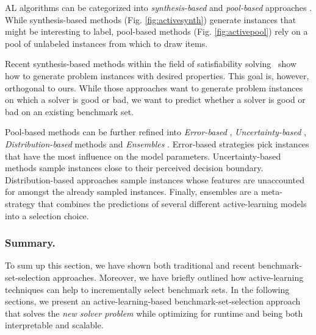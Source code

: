 \documentclass[runningheads]{llncs}
\begin{document}

AL algorithms can be categorized into \textit{synthesis-bas\-ed} \cite{0001AEMN22,GarzonMG22,2019gaal} and \textit{pool-bas\-ed} approaches \cite{GolbandiKL11,distribAL,HarpaleY08,KapoorGUD07,KorenBV09,KornerW06,MelvilleM04,SinhaED19,TongK01}.
While synthesis-based methods (Fig. \ref{fig:activesynth}) generate instances that might be interesting to label, pool-based methods (Fig. \ref{fig:activepool}) rely on a pool of unlabeled instances from which to draw items.

Recent synthesis-based methods within the field of satisfiability solving~\cite{0001AEMN22,GarzonMG22} show how to generate problem instances with desired properties.
This goal is, however, orthogonal to ours.
While those approaches want to generate problem instances on which a solver is good or bad, we want to predict whether a solver is good or bad on an existing benchmark set.

Pool-based methods can be further refined into \textit{Error-based} \cite{GolbandiKL11,KorenBV09}, \textit{Un\-cer\-tain\-ty-based} \cite{HarpaleY08,KapoorGUD07,TongK01}, \textit{Distribution-based} methods \cite{distribAL,SinhaED19} and \textit{Ensembles} \cite{KornerW06,MelvilleM04}.
Error-based strategies pick instances that have the most influence on the model parameters.
Uncertainty-based methods sample instances close to their perceived decision boundary.
Distribution-based approaches sample instances whose features are unaccounted for amongst the already sampled instances.
Finally, ensembles are a meta-strategy that combines the predictions of several different active-learning models into a selection choice.

\subsubsection{Summary.}
To sum up this section, we have shown both traditional and recent benchmark-set-selection approaches. Moreover, we have briefly outlined how active-learning techniques can help to incrementally select benchmark sets. In the following sections, we present an active-learning-based benchmark-set-selection approach that solves the \textit{new solver problem} while optimizing for runtime and being both interpretable and scalable.
\end{document}
